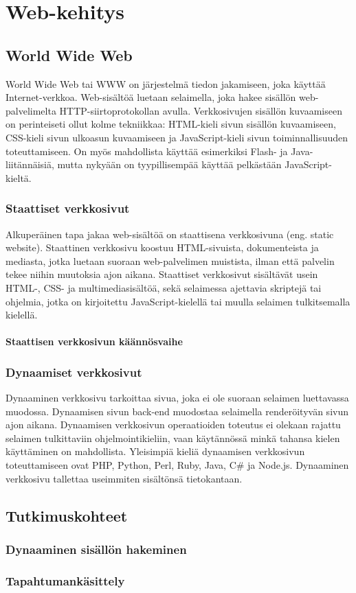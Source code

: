 \chapter{Web-kehitys}

\section{World Wide Web}
World Wide Web tai WWW on järjestelmä tiedon jakamiseen, joka käyttää Internet-verkkoa. Web-sisältöä luetaan selaimella,
joka hakee sisällön web-palvelimelta HTTP-siirtoprotokollan avulla. Verkkosivujen sisällön kuvaamiseen on perinteiseti
ollut kolme tekniikkaa: HTML-kieli sivun sisällön kuvaamiseen, CSS-kieli sivun ulkoasun kuvaamiseen ja JavaScript-kieli
sivun toiminnallisuuden toteuttamiseen. On myös mahdollista käyttää esimerkiksi Flash- ja Java-liitännäisiä, mutta
nykyään on tyypillisempää käyttää pelkästään JavaScript-kieltä. \cite{javascriptguide}

\subsection{Staattiset verkkosivut}
Alkuperäinen tapa jakaa web-sisältöä on staattisena verkkosivuna (eng. static website). Staattinen verkkosivu koostuu
HTML-sivuista, dokumenteista ja mediasta, jotka luetaan suoraan web-palvelimen muistista, ilman että palvelin tekee
niihin muutoksia ajon aikana. Staattiset verkkosivut sisältävät usein HTML-, CSS- ja multimediasisältöä, sekä selaimessa
ajettavia skriptejä tai ohjelmia, jotka on kirjoitettu JavaScript-kielellä tai muulla selaimen tulkitsemalla kielellä.
\cite{staticdynamicwebsites}

\subsubsection{Staattisen verkkosivun käännösvaihe}

\subsection{Dynaamiset verkkosivut}
Dynaaminen verkkosivu tarkoittaa sivua, joka ei ole suoraan selaimen luettavassa muodossa. Dynaamisen sivun back-end
muodostaa selaimella renderöityvän sivun ajon aikana. Dynaamisen verkkosivun operaatioiden toteutus ei olekaan rajattu
selaimen tulkittaviin ohjelmointikieliin, vaan käytännössä minkä tahansa kielen käyttäminen on mahdollista. Yleisimpiä
kieliä dynaamisen verkkosivun toteuttamiseen ovat PHP, Python, Perl, Ruby, Java, C\# ja Node.js. Dynaaminen verkkosivu
tallettaa useimmiten sisältönsä tietokantaan. \cite{staticdynamicwebsites}

\section{Tutkimuskohteet}

\subsection{Dynaaminen sisällön hakeminen}

\subsection{Tapahtumankäsittely}
